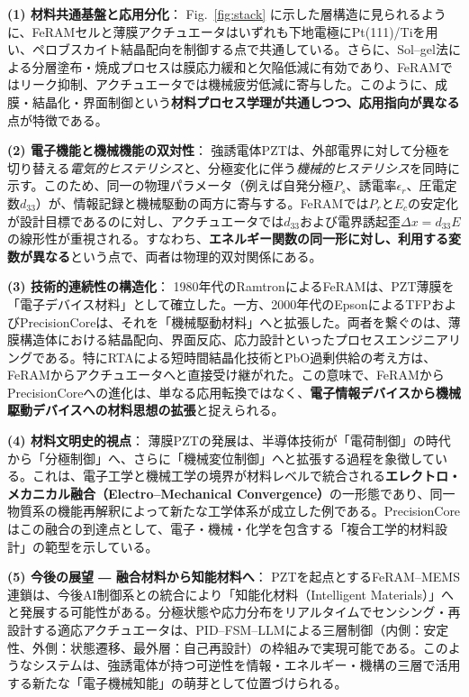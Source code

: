 \documentclass[conference]{IEEEtran}
\begin{document}
\medskip
\noindent
\textbf{(1) 材料共通基盤と応用分化}：
Fig.~\ref{fig:stack} に示した層構造に見られるように、FeRAMセルと薄膜アクチュエータはいずれも下地電極にPt(111)/Tiを用い、ペロブスカイト結晶配向を制御する点で共通している。さらに、Sol--gel法による分層塗布・焼成プロセスは膜応力緩和と欠陥低減に有効であり、FeRAMではリーク抑制、アクチュエータでは機械疲労低減に寄与した。このように、成膜・結晶化・界面制御という\textbf{材料プロセス学理が共通しつつ、応用指向が異なる}点が特徴である。

\medskip
\noindent
\textbf{(2) 電子機能と機械機能の双対性}：
強誘電体PZTは、外部電界に対して分極を切り替える\textit{電気的ヒステリシス}と、分極変化に伴う\textit{機械的ヒステリシス}を同時に示す。このため、同一の物理パラメータ（例えば自発分極$P_s$、誘電率$\epsilon_r$、圧電定数$d_{33}$）が、情報記録と機械駆動の両方に寄与する。FeRAMでは$P_r$と$E_c$の安定化が設計目標であるのに対し、アクチュエータでは$d_{33}$および電界誘起歪$\Delta x = d_{33} E$の線形性が重視される。すなわち、\textbf{エネルギー関数の同一形に対し、利用する変数が異なる}という点で、両者は物理的双対関係にある。

\medskip
\noindent
\textbf{(3) 技術的連続性の構造化}：
1980年代のRamtronによるFeRAMは、PZT薄膜を「電子デバイス材料」として確立した。一方、2000年代のEpsonによるTFPおよびPrecisionCoreは、それを「機械駆動材料」へと拡張した。両者を繋ぐのは、薄膜構造体における結晶配向、界面反応、応力設計といったプロセスエンジニアリングである。特にRTAによる短時間結晶化技術とPbO過剰供給の考え方は、FeRAMからアクチュエータへと直接受け継がれた。この意味で、FeRAMからPrecisionCoreへの進化は、単なる応用転換ではなく、\textbf{電子情報デバイスから機械駆動デバイスへの材料思想の拡張}と捉えられる。

\medskip
\noindent
\textbf{(4) 材料文明史的視点}：
薄膜PZTの発展は、半導体技術が「電荷制御」の時代から「分極制御」へ、さらに「機械変位制御」へと拡張する過程を象徴している。これは、電子工学と機械工学の境界が材料レベルで統合される\textbf{エレクトロ・メカニカル融合（Electro–Mechanical Convergence）}の一形態であり、同一物質系の機能再解釈によって新たな工学体系が成立した例である。PrecisionCoreはこの融合の到達点として、電子・機械・化学を包含する「複合工学的材料設計」の範型を示している。

\medskip
\noindent
\textbf{(5) 今後の展望 ― 融合材料から知能材料へ}：
PZTを起点とするFeRAM--MEMS連鎖は、今後AI制御系との統合により「知能化材料（Intelligent Materials）」へと発展する可能性がある。分極状態や応力分布をリアルタイムでセンシング・再設計する適応アクチュエータは、PID--FSM--LLMによる三層制御（内側：安定性、外側：状態遷移、最外層：自己再設計）の枠組みで実現可能である\cite{samizo2025aitl_architecture}。このようなシステムは、強誘電体が持つ可逆性を情報・エネルギー・機構の三層で活用する新たな「電子機械知能」の萌芽として位置づけられる。
\end{document}
